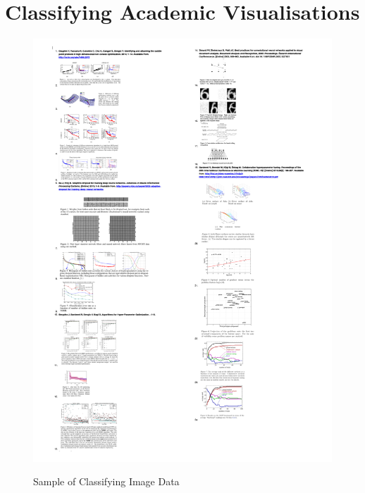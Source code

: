 \documentclass[a4paper,11pt,titlepage]{article}
\begin{document}
	\section{Classifying Academic Visualisations}
		 \begin{figure}[H]
    			\centering	
	{{\includegraphics[width=16cm]
    				{img/explanation_research_02} 
    			}}%
    			\caption{Sample of Classifying Image Data}%
    		\label{fig:studentprofile}
		\end{figure}
\end{document}
